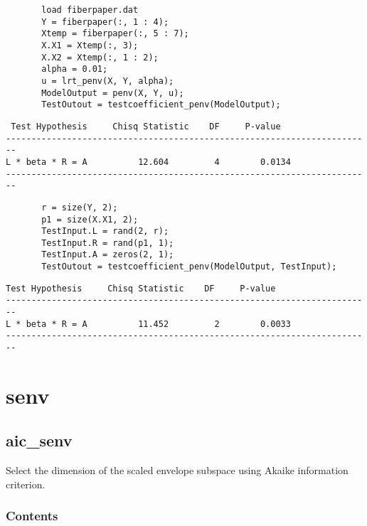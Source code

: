 \documentclass[a4paper,11pt,openany]{memoir}
\begin{document}
\begin{verbatim}       load fiberpaper.dat
       Y = fiberpaper(:, 1 : 4);
       Xtemp = fiberpaper(:, 5 : 7);
       X.X1 = Xtemp(:, 3);
       X.X2 = Xtemp(:, 1 : 2);
       alpha = 0.01;
       u = lrt_penv(X, Y, alpha);
       ModelOutput = penv(X, Y, u);
       TestOutout = testcoefficient_penv(ModelOutput);\end{verbatim}
        \color{lightgray}\ttfamily \begin{verbatim}
 Test Hypothesis     Chisq Statistic    DF     P-value
------------------------------------------------------------------------
L * beta * R = A          12.604         4        0.0134
------------------------------------------------------------------------
\end{verbatim} \rmfamily
\color{black}
\begin{verbatim}
       r = size(Y, 2);
       p1 = size(X.X1, 2);
       TestInput.L = rand(2, r);
       TestInput.R = rand(p1, 1);
       TestInput.A = zeros(2, 1);
       TestOutout = testcoefficient_penv(ModelOutput, TestInput);\end{verbatim}
   

         \color{lightgray}\ttfamily \begin{verbatim}
Test Hypothesis     Chisq Statistic    DF     P-value
------------------------------------------------------------------------
L * beta * R = A          11.452         2        0.0033
------------------------------------------------------------------------
\end{verbatim} \rmfamily
\color{black}

\newpage
\chapter{senv}
    
    
\rmfamily
\color{black}\section{aic\_senv}

\begin{par}
Select the dimension of the scaled envelope subspace using Akaike information criterion.
\end{par} \vspace{1em}

\subsection*{Contents}
\end{document}
